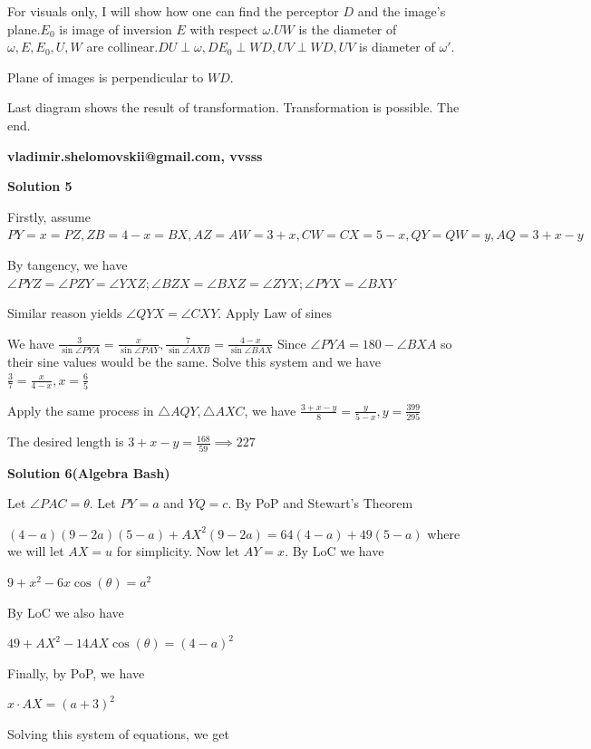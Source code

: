\begin{enumerate}
 For visuals only, I will show how one can find the perceptor $D$ and the image’s plane.$E_0$ is image of inversion $E$ with respect $\omega.$$UW$ is the diameter of $\omega, E,E_0,U,W$ are collinear.$DU \perp \omega, DE_0\perp WD, UV \perp WD, UV$ is diameter of $\omega'$.

 Plane of images is perpendicular to $WD.$

 Last diagram shows the result of transformation. Transformation is possible. The end.

 \textbf{vladimir.shelomovskii@gmail.com, vvsss}

 



\textbf{Solution 5}

Firstly, assume $PY=x=PZ, ZB=4-x=BX, AZ=AW=3+x, CW=CX=5-x, QY=QW=y, AQ=3+x-y$

 By tangency, we have $\angle{PYZ}=\angle{PZY}=\angle{YXZ}; \angle{BZX}=\angle{BXZ}=\angle{ZYX}; \angle{PYX}=\angle{BXY}$

 Similar reason yields $\angle{QYX}=\angle{CXY}$. Apply Law of sines

 We have $\frac{3}{\sin{\angle{PYA}}}=\frac{x}{\sin{\angle{PAY}}}, \frac{7}{\sin{\angle{AXB}}}=\frac{4-x}{\sin{\angle{BAX}}}$ Since $\angle{PYA}=180-\angle{BXA}$ so their sine values would be the same. Solve this system and we have $\frac{3}{7}=\frac{x}{4-x}, x=\frac{6}{5}$

 Apply the same process in $\triangle{AQY}, \triangle{AXC}$, we have $\frac{3+x-y}{8}=\frac{y}{5-x}, y=\frac{399}{295}$

 The desired length is $3+x-y=\frac{168}{59}\implies \boxed{227}$




\textbf{Solution 6(Algebra Bash)}

Let $\angle PAC = \theta$. Let $PY = a$ and $YQ = c$. By PoP and Stewart's Theorem

 $(4 - a)(9 - 2a)(5 - a) + AX^2 (9 - 2a) = 64(4 - a) + 49(5 - a)$ where we will let $AX = u$ for simplicity. Now let $AY = x$. By LoC we have

 $9 + x^2 - 6x\cos(\theta) = a^2$

 By LoC we also have

 $49 + AX^2 - 14 AX \cos(\theta) = (4 - a)^2$

 Finally, by PoP, we have

 $x \cdot AX = (a + 3)^2$

 Solving this system of equations, we get


\end{enumerate}

